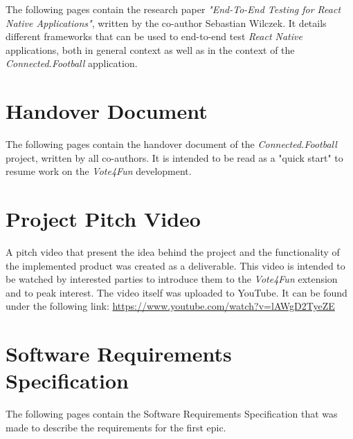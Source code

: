 \begin{appendices}
The following pages contain the research paper \textit{"End-To-End Testing for React Native Applications"}, written by the co-author Sebastian Wilczek. It details different frameworks that can be used to end-to-end test \textit{React Native} applications, both in general context as well as in the context of the \textit{Connected.Football} application.



\newpage

\section{Handover Document}
\label{appendix:handover_document}

The following pages contain the handover document of the \textit{Connected.Football} project, written by all co-authors. It is intended to be read as a "quick start" to resume work on the \textit{Vote4Fun} development.



\newpage

\section{Project Pitch Video}
\label{appendix:pitch_video}

A pitch video that present the idea behind the project and the functionality of the implemented product was created as a deliverable. This video is intended to be watched by interested parties to introduce them to the \textit{Vote4Fun} extension and to peak interest.
\newline
The video itself was uploaded to YouTube. It can be found under the following link: \url{https://www.youtube.com/watch?v=lAWgD2TyeZE}

\newpage

\section{Software Requirements Specification}
\label{appendix:srs}

The following pages contain the Software Requirements Specification that was made to describe the requirements for the first epic.



\end{appendices}